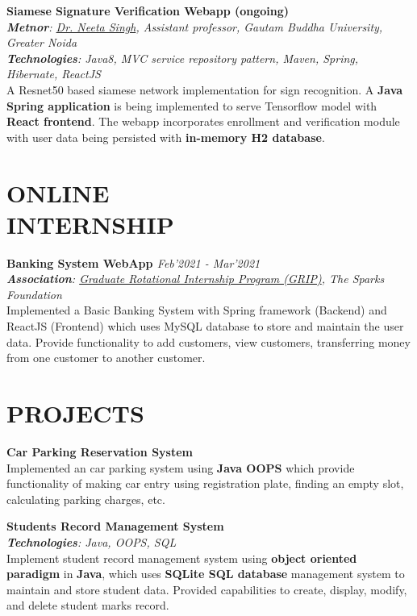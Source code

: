 \documentclass[resmargin]{res}
\begin{document}
\begin{resume}
\textbf{Siamese Signature Verification Webapp (ongoing)} {\sl  \hfill}
\\{\sl \textbf{Metnor}: \href{https://sites.google.com/view/neetasingh112}{Dr. Neeta Singh}, Assistant professor, Gautam Buddha University, Greater Noida}
\\{\sl \textbf{Technologies}: Java8, MVC service repository pattern, Maven, Spring, Hibernate, ReactJS}
\\ A Resnet50 based siamese network implementation for sign recognition. A \textbf{Java Spring application} is being implemented to serve Tensorflow model with \textbf{React frontend}. The webapp incorporates enrollment and verification module with user data being persisted with \textbf{in-memory H2 database}.

\section{ONLINE\\ INTERNSHIP}

\textbf{Banking System WebApp
\href{https://www.youtube.com/watch?v=uO6ZealjeIA}{} \href{https://github.com/malavp1998/bank-management-service}{\faGitSquare} \href{https://github.com/malavp1998/bank-management-web}{\faGitSquare}} {\sl  \hfill Feb'2021 - Mar'2021}
\\{\sl \textbf{Association}: \href{https://www.thesparksfoundationsingapore.org/join-us/internship-positions/}{Graduate Rotational Internship Program (GRIP)}, The Sparks Foundation}
\\Implemented a Basic Banking System with Spring framework (Backend) and ReactJS (Frontend) which uses MySQL database to store and maintain the user data.
Provide functionality to add customers, view customers, transferring money from one customer to another customer.

\section{PROJECTS}

\textbf{Car Parking Reservation System \href{https://github.com/malavp1998/parking-lot}{\faGitSquare}
}{\sl\hfill}
\\ Implemented an car parking system using \textbf{Java OOPS} which provide functionality of making car entry using registration plate, finding an empty slot, calculating parking charges, etc. 

\textbf{Students Record Management System \href{https://github.com/malavp1998/springboot-with-mongoDB}{\faGitSquare} \href{https://github.com/malavp1998/spring-boot-SqliteDB}{\faGitSquare}} {\sl  \hfill}
\\{\sl \textbf{Technologies}: Java, OOPS, SQL}
\\ Implement student record management system using \textbf{object oriented paradigm} in \textbf{Java}, which uses \textbf{SQLite SQL database} management system to maintain and store student data. Provided capabilities to create, display, modify, and delete student marks record. 


\end{resume}
\end{document}
